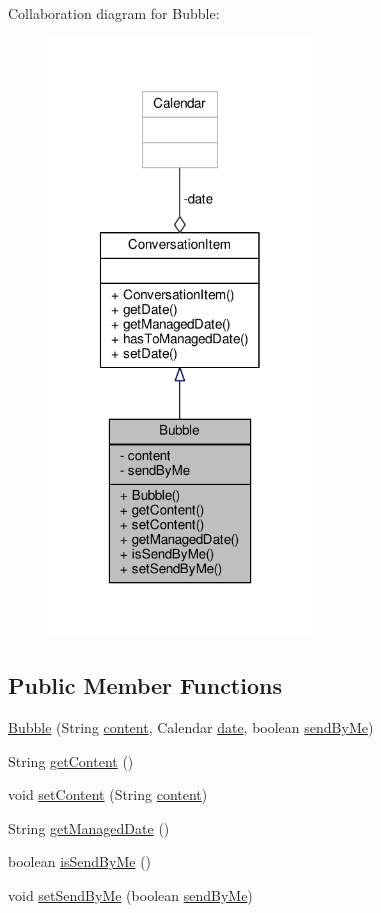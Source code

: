 Collaboration diagram for Bubble\+:
\nopagebreak
\begin{figure}[H]
\begin{center}
\leavevmode
\includegraphics[width=198pt]{a00056}
\end{center}
\end{figure}
\subsection*{Public Member Functions}
\begin{DoxyCompactItemize}
\item 
\hyperlink{a00004_a3c1c7b516864bb50a824afc262da30ce}{Bubble} (String \hyperlink{a00004_a5afce1c98d73512f8ffcb0482df23708}{content}, Calendar \hyperlink{a00008_aa713d1025d73543bd4eae313a1868570}{date}, boolean \hyperlink{a00004_a87564ae3e1ae394e9b16de538dbf8067}{send\+By\+Me})
\item 
String \hyperlink{a00004_ab19dc9b592b32a2db1af785e9083d0e5}{get\+Content} ()
\item 
void \hyperlink{a00004_a31abdf74d2b9d2afe2db6c12c6451501}{set\+Content} (String \hyperlink{a00004_a5afce1c98d73512f8ffcb0482df23708}{content})
\item 
String \hyperlink{a00004_aa53441954dd0352c8b8964194365c688}{get\+Managed\+Date} ()
\item 
boolean \hyperlink{a00004_a0506f5775946d7c4db49b611d57fa3da}{is\+Send\+By\+Me} ()
\item 
void \hyperlink{a00004_a10871b9b5592dcf11e26eaed8e407682}{set\+Send\+By\+Me} (boolean \hyperlink{a00004_a87564ae3e1ae394e9b16de538dbf8067}{send\+By\+Me})
\end{DoxyCompactItemize}
